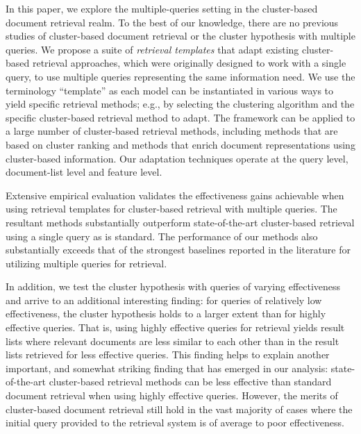 
In this paper, we explore the multiple-queries setting in the
cluster-based document retrieval realm.
To the best of our knowledge, there are no previous studies of
cluster-based document retrieval or the cluster hypothesis with
multiple queries.
We propose a suite of {\em retrieval templates} that adapt existing
cluster-based retrieval approaches, which were originally designed to
work with a single query, to use multiple queries representing the
same information need.
We use the terminology ``template'' as each model can be instantiated
in various ways to yield specific retrieval methods; e.g., by
selecting the clustering algorithm and the specific cluster-based
retrieval method to adapt.
The framework can be applied to a large number of cluster-based
retrieval methods, including methods that are based on cluster
ranking and methods that enrich document representations using
cluster-based information.
Our adaptation techniques operate at the query level, document-list
level and feature level.

Extensive empirical evaluation validates the effectiveness gains
achievable when using retrieval templates for cluster-based
retrieval with multiple queries.
The resultant methods substantially outperform state-of-the-art
cluster-based retrieval using a single query as is standard.
The performance of our methods also substantially exceeds that of the
strongest baselines reported in the literature for utilizing multiple
queries for retrieval.

In addition, we test the cluster hypothesis with queries of varying
effectiveness and arrive to an additional interesting finding: for queries of relatively low effectiveness, the cluster hypothesis holds to a larger
extent than for highly effective queries.  That is, using highly
effective queries for retrieval yields result lists where relevant
documents are less similar to each other than in the result lists
retrieved for less effective queries.
This finding helps to explain another important,
and somewhat striking finding that has emerged in our analysis:
state-of-the-art cluster-based retrieval methods can be less effective
than standard document retrieval when using highly effective queries.
However, the merits of cluster-based document retrieval still hold in
the vast majority of cases where the initial query provided to the
retrieval system is of average to poor effectiveness.

